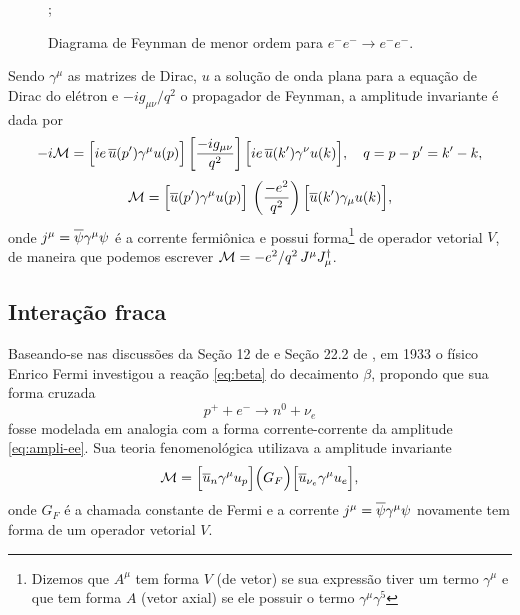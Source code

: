 \documentclass[12pt]{report}
\begin{document}
\begin{figure}[H]
\centering
{};
\caption{Diagrama de Feynman de menor ordem para $e^- e^- \to e^- e^-$.}
\label{fig:electron-electron}
\end{figure}
Sendo $\gamma^\mu$ as matrizes de Dirac, $u$ a solução de onda plana para a equação de Dirac do elétron e $-i g_{\mu\nu}/q^2$ o propagador de Feynman, a amplitude invariante é dada por
$$
-i\mathcal{M} = \Big[ie \, \overline{u}(p') \gamma^\mu u(p)\Big] \,
\qty[\frac{- i g_{\mu \nu}}{q^2}] \,
\Big[ie \, \overline{u}(k') \gamma^\nu u(k)\Big] ,
\quad q = p - p' = k' - k,
$$
\begin{equation} \label{eq:ampli-ee}
\mathcal{M} =
\Big[\overline{u}(p') \gamma^\mu u(p)\Big] \, \,
\qty(\frac{- e^2}{q^2}) \,
\Big[\overline{u}(k') \gamma_\mu u(k)\Big] ,
\end{equation}
onde $j^\mu = \overline{\psi} \gamma^\mu \psi$ é a corrente fermiônica e possui forma\footnote{Dizemos que $A^\mu$ tem forma $V$ (de vetor) se sua expressão tiver um termo $\gamma^\mu$ e que tem forma $A$ (vetor axial) se ele possuir o termo $\gamma^\mu \gamma^5$} de operador vetorial $V$, de maneira que podemos escrever $\mathcal{M} = -e^2/q^2 \, J^\mu J_\mu^\dagger$.

\subsection{Interação fraca} \label{sec:weak-int}

Baseando-se nas discussões da Seção 12 de \cite{halzen} e Seção 22.2 de \cite{schwartz}, em 1933 o físico Enrico Fermi investigou a reação \ref{eq:beta} do decaimento $\beta$, propondo que sua forma cruzada
\begin{equation} \label{eq:beta-crossed}
p^+ + e^- \to n^0 + \nu_e
\end{equation}
fosse modelada em analogia com a forma corrente-corrente da amplitude \ref{eq:ampli-ee}. Sua teoria fenomenológica utilizava a amplitude invariante
\begin{equation} \label{eq:fermi-ampli}
\mathcal{M} = \Big[ \overline{u}_n \gamma^\mu u_p \Big] \Big( G_F \Big) \Big[ \overline{u}_{\nu_e} \gamma^\mu u_e \Big],
\end{equation}
onde $G_F$ é a chamada constante de Fermi e a corrente $j^\mu = \overline{\psi} \gamma^\mu \psi$ novamente tem forma de um operador vetorial $V$.
\end{document}
